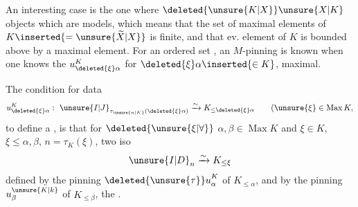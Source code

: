 An interesting case is the one where $\deleted{\unsure{K|X}}\unsure{X|K}$  objects which are models, which means that the set of maximal elements of $K\inserted{=\unsure{\widetilde X|X}}$ is finite, and that ev. element of $K$ is bounded above by a maximal element. For an ordered set   , an $M$-pinning is known when one knows the $u^K_{\deleted{\xi}\alpha}$ for $\deleted{\xi}\alpha\inserted{\in K}$, maximal.

The condition for data
\[
u^K_{\deleted{\xi}\alpha}:\ {\unsure{I|J}}_{\tau_{\unsure{n|K}}(\deleted{\xi}\alpha)}
   \xrightarrow{\sim} K_{\leq\deleted{\xi}\alpha}\qquad
   (\unsure{\xi}\in\operatorname{Max}K,
\]
to define a , is that for $\deleted{\unsure{\xi|\forall}}$ $\alpha,\beta\in\operatorname{Max}K$ and $\xi\in K$, $\xi\leq\alpha,\beta$,  $n=\tau_K(\xi)$,  two iso
\[
{\unsure{I|D}}_n\xrightarrow{\sim}K_{\leq\xi}
\]
defined by the pinning  $ {\deleted{\unsure{\tau}}u}^K_\alpha$ of $K_{\leq\alpha}$, and by the pinning $u^{\unsure{K|k}}_\beta$ of $K_{\leq\beta}$,  the .
